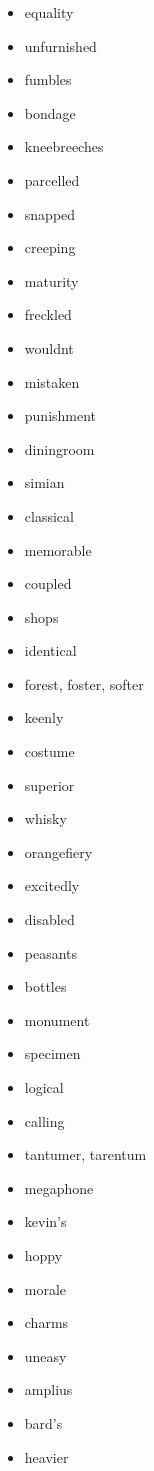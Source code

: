 \documentclass{article}
\begin{document}
\begin{itemize}
    \item equality
    \item unfurnished
    \item fumbles
    \item bondage
    \item kneebreeches
    \item parcelled
    \item snapped
    \item creeping
    \item maturity
    \item freckled
    \item wouldnt
    \item mistaken
    \item punishment
    \item diningroom
    \item simian
    \item classical
    \item memorable
    \item coupled
    \item shops
    \item identical
    \item forest, foster, softer
    \item keenly
    \item costume
    \item superior
    \item whisky
    \item orangefiery
    \item excitedly
    \item disabled
    \item peasants
    \item bottles
    \item monument
    \item specimen
    \item logical
    \item calling
    \item tantumer, tarentum
    \item megaphone
    \item kevin's
    \item hoppy
    \item morale
    \item charms
    \item uneasy
    \item amplius
    \item bard's
    \item heavier

\end{itemize}
\end{document}
